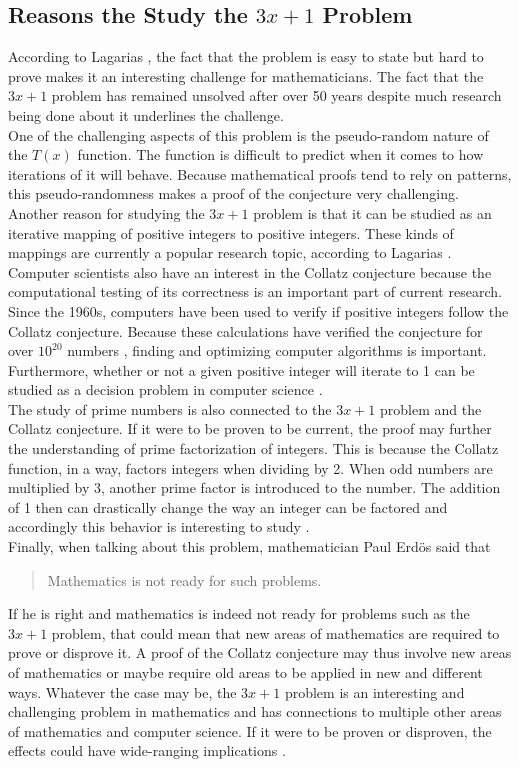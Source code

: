 \documentclass[12pt,a4paper,reqno]{amsart}
\begin{document}
\subsection{Reasons the Study the $3x+1$ Problem}

According to Lagarias \cite{src:03}, the fact that the problem is easy to state 
but hard to prove makes it an interesting challenge for mathematicians.
The fact that the $3x+1$ problem has remained unsolved after over 50 years
despite much research being done about it underlines the challenge. \\
One of the challenging aspects of this problem is the pseudo-random nature of 
the $T(x)$ function. The function is difficult to predict when it comes to how 
iterations of it will behave. Because mathematical proofs tend to rely on 
patterns, this pseudo-randomness makes a proof of the conjecture very
challenging. \\
Another reason for studying the $3x+1$ problem is that it can be studied as an 
iterative mapping of positive integers to positive integers. These kinds of
mappings are currently a popular research topic, according to Lagarias
\cite{src:03}. \\
Computer scientists also have an interest in the Collatz conjecture because 
the computational testing of its correctness is an important part of 
current research. Since the 1960s, computers have been used to verify if
positive integers follow the Collatz conjecture.
Because these calculations have verified the conjecture for over $10^{20}$ 
numbers \cite{src:04}, finding and optimizing computer algorithms is important. 
Furthermore, whether or not a given positive integer will iterate to 1 can be 
studied as a decision problem in computer science \cite{src:03}. \\
The study of prime numbers is also connected to the $3x+1$ problem and the
Collatz conjecture. If it were to be proven to be current, the proof may
further the understanding of prime factorization of integers. This is because 
the Collatz function, in a way, factors integers when dividing by 2. When odd 
numbers are multiplied by 3, another prime factor is introduced to the number.
The addition of 1 then can drastically change the way an integer can be
factored and accordingly this behavior is interesting to study \cite{src:03}.\\
Finally, when talking about this problem, mathematician Paul Erdös said that
\begin{quote}
Mathematics is not ready for such problems.
\end{quote}
If he is right and mathematics is indeed not ready for problems such as the
$3x+1$ problem, that could mean that new areas of mathematics are required to
prove or disprove it. A proof of the Collatz conjecture may thus involve new 
areas of mathematics or maybe require old areas to be applied in new and
different ways. Whatever the case may be, the $3x+1$ problem is an interesting
and challenging problem in mathematics and has connections to multiple other
areas of mathematics and computer science. If it were to be proven or
disproven, the effects could have wide-ranging implications \cite{src:03}.
\end{document}
